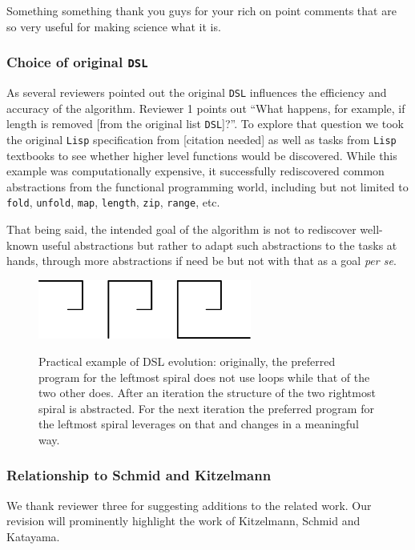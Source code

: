 \documentclass{article}
\begin{document}
Something something thank you guys for your rich on point comments that are so
very useful for making science what it is.

\subsubsection*{Choice of original \texttt{DSL}}

As several reviewers pointed out the original \texttt{DSL} influences the efficiency and
accuracy of the algorithm. Reviewer 1 points out ``What happens, for example, if
length is removed [from the original list \texttt{DSL}]?''. To explore that question we
took the original \texttt{Lisp} specification from [citation needed] as well as
tasks from \texttt{Lisp} textbooks to see whether higher level functions would
be discovered. While this example was computationally expensive, it successfully
rediscovered common abstractions from the functional programming world,
including but not limited to \texttt{fold}, \texttt{unfold}, \texttt{map},
\texttt{length}, \texttt{zip}, \texttt{range}, etc.

That being said, the intended goal of the algorithm is not to rediscover
well-known useful abstractions but rather to adapt such abstractions to the
tasks at hands, through more abstractions if need be but not with that as a goal
\textit{per se}.

\begin{figure}
  \centering
  \includegraphics[width=7cm]{figures/rebutal/spirals.eps}\label{geomCompiled}
  \caption{Practical example of DSL evolution: originally, the preferred program
  for the leftmost spiral does not use loops while that of the two other does.
  After an iteration the structure of the two rightmost spiral is abstracted.
  For the next iteration the preferred program for the leftmost spiral leverages
  on that and changes in a meaningful way.}
\end{figure}

\subsubsection*{Relationship to Schmid and Kitzelmann}

We thank reviewer three for suggesting additions to the related work. Our
revision will prominently highlight the work of Kitzelmann, Schmid and Katayama.
\end{document}
